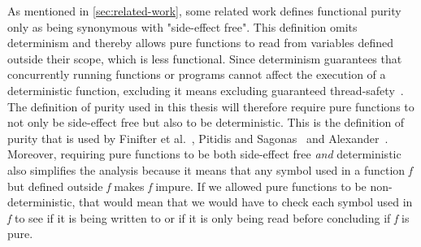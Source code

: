 \documentclass[a4paper,12pt]{article}
\begin{document}
As mentioned in \autoref{sec:related-work}, some related work defines functional purity only as being synonymous with "side-effect free". This definition omits determinism and thereby allows pure functions to read from variables defined outside their scope, which is less functional. Since determinism guarantees that concurrently running functions or programs cannot affect the execution of a deterministic function, excluding it means excluding guaranteed thread-safety~\cite{purity-in-java}. The definition of purity used in this thesis will therefore require pure functions to not only be side-effect free but also to be deterministic. This is the definition of purity that is used by Finifter et al.~\cite{purity-in-java}, Pitidis and Sagonas~\cite{pitidis2010purity} and Alexander~\cite{alvin-alexander}. %
Moreover, requiring pure functions to be both side-effect free \textit{and} deterministic also simplifies the analysis because it means that any symbol used in a function \textit{f} but defined outside \textit{f} makes \textit{f} impure. If we allowed pure functions to be non-deterministic, that would mean that we would have to check each symbol used in \textit{f} to see if it is being written to or if it is only being read before concluding if \textit{f} is pure.




\end{document}
